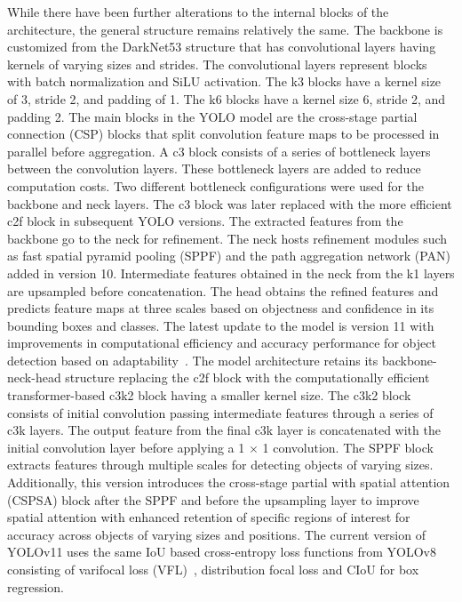 \documentclass{article}
\begin{document}
While there have been further alterations to the internal blocks of the architecture, the general structure remains relatively the same. The backbone is customized from the DarkNet53 structure that has convolutional layers having kernels of varying sizes and strides. The convolutional layers represent blocks with batch normalization and SiLU activation. The k3 blocks have a kernel size of 3, stride 2, and padding of 1. The k6 blocks have a kernel size 6, stride 2, and padding 2. The main blocks in the YOLO model are the cross-stage partial connection (CSP) blocks that split convolution feature maps to be processed in parallel before aggregation. A c3 block consists of a series of bottleneck layers between the convolution layers. These bottleneck layers are added to reduce computation costs. Two different bottleneck configurations were used for the backbone and neck layers. The c3 block was later replaced with the more efficient c2f block in subsequent YOLO versions. The extracted features from the backbone go to the neck for refinement. The neck hosts refinement modules such as fast spatial pyramid pooling (SPPF) and the path aggregation network (PAN) added in version 10. Intermediate features obtained in the neck from the k1 layers are upsampled before concatenation. The head obtains the refined features and predicts feature maps at three scales based on objectness and confidence in its bounding boxes and classes. The latest update to the model is version 11 with improvements in computational efficiency and accuracy performance for object detection based on adaptability~\cite{2024Rahima}. The model architecture retains its backbone-neck-head structure replacing the c2f block with the computationally efficient transformer-based c3k2 block having a smaller kernel size. The c3k2 block consists of initial convolution passing intermediate features through a series of c3k layers. The output feature from the final c3k layer is concatenated with the initial convolution layer before applying a 1 $\times$ 1 convolution. The SPPF block extracts features through multiple scales for detecting objects of varying sizes. Additionally, this version introduces the cross-stage partial with spatial attention (CSPSA) block after the SPPF and before the upsampling layer to improve spatial attention with enhanced retention of specific regions of interest for accuracy across objects of varying sizes and positions.
The current version of YOLOv11 uses the same IoU based cross-entropy loss functions from YOLOv8 consisting of varifocal loss (VFL)~\cite{2021Zhang2}, distribution focal loss and CIoU for box regression.
\end{document}
